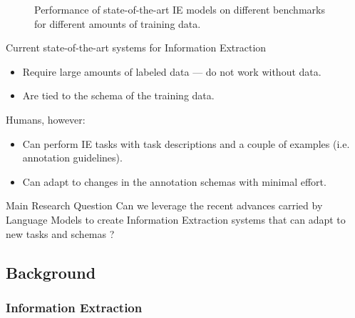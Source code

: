 \documentclass[
    11pt,
    notheorems,
    xcolor={dvipsnames},
    hyperref={
        pdfstartview=FitH, 
        pdftitle={Ikasketa-adibide urriko Informazio-Erauzketa}, 
        pdfauthor={Oscar Sainz Jimenez}, 
        citecolor=secondary, 
    }
]{beamer}
\begin{document}
\begin{frame}

    \begin{figure}
        \centering
        \resizebox{\textwidth}{!}{
            
        }
        \caption{Performance of state-of-the-art IE models on different benchmarks for different amounts of training data.}
    \end{figure}

    Current state-of-the-art systems for Information Extraction
    \begin{itemize}
        \item Require large amounts of labeled data --- do not work without data.
        \item Are tied to the schema of the training data.
    \end{itemize}

\end{frame}

\begin{frame}

    Humans, however:
    \begin{itemize}
        \item Can perform IE tasks with task descriptions and a couple of examples (i.e. annotation guidelines).
        \item Can adapt to changes in the annotation schemas with minimal effort.
    \end{itemize}
    \blockskip
    \begin{block}{Main Research Question}
        Can we leverage the recent advances carried by Language Models to create Information Extraction systems that can adapt to new tasks and schemas ?
    \end{block}
\end{frame}

\subsection{Background}

\subsubsection{Information Extraction}
\makesubsectiontitlepage
\end{document}
